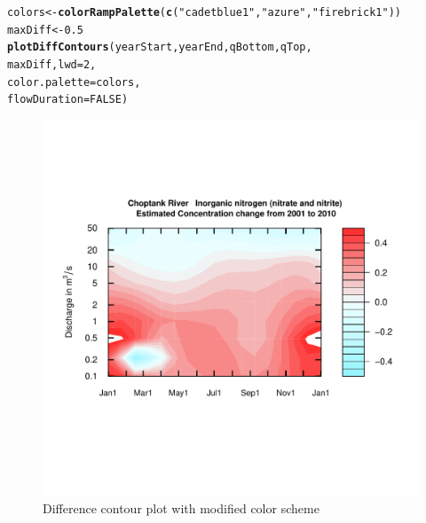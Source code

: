 \documentclass[a4paper,11pt]{article}\usepackage[]{graphicx}\usepackage[]{color}
\makeatletter
\newcommand{\hlnum}[1]{\textcolor[rgb]{0.686,0.059,0.569}{#1}}%
\newcommand{\hlstr}[1]{\textcolor[rgb]{0.192,0.494,0.8}{#1}}%
\newcommand{\hlstd}[1]{\textcolor[rgb]{0.345,0.345,0.345}{#1}}%
\newcommand{\hlkwb}[1]{\textcolor[rgb]{0.69,0.353,0.396}{#1}}%
\newcommand{\hlkwc}[1]{\textcolor[rgb]{0.333,0.667,0.333}{#1}}%
\newcommand{\hlkwd}[1]{\textcolor[rgb]{0.737,0.353,0.396}{\textbf{#1}}}%
\newenvironment{kframe}{%
 \def\at@end@of@kframe{}%
 \ifinner\ifhmode%
  \def\at@end@of@kframe{\end{minipage}}%
  \begin{minipage}{\columnwidth}%
 \fi\fi%
 \def\FrameCommand##1{\hskip\@totalleftmargin \hskip-\fboxsep
 \colorbox{shadecolor}{##1}\hskip-\fboxsep
     \hskip-\linewidth \hskip-\@totalleftmargin \hskip\columnwidth}%
 \MakeFramed {\advance\hsize-\width
   \@totalleftmargin\z@ \linewidth\hsize
   \@setminipage}}%
 {\par\unskip\endMakeFramed%
 \at@end@of@kframe}
\newenvironment{knitrout}{}{} %
\makeatother
\begin{document}
\begin{knitrout}
\color{fgcolor}\begin{kframe}
\begin{alltt}
\hlstd{colors} \hlkwb{<-} \hlkwd{colorRampPalette}\hlstd{(}\hlkwd{c}\hlstd{(}\hlstr{"cadetblue1"}\hlstd{,}\hlstr{"azure"}\hlstd{,}\hlstr{"firebrick1"}\hlstd{))}
\hlstd{maxDiff}\hlkwb{<-}\hlnum{0.5}
\hlkwd{plotDiffContours}\hlstd{(yearStart,yearEnd,qBottom,qTop,}
             \hlstd{maxDiff,}\hlkwc{lwd}\hlstd{=}\hlnum{2}\hlstd{,}
             \hlkwc{color.palette}\hlstd{=colors,}
             \hlkwc{flowDuration}\hlstd{=}\hlnum{FALSE}\hlstd{)}
\end{alltt}
\end{kframe}\begin{figure}[]

\includegraphics[width=1\linewidth,height=1\linewidth]{figure/modifiedDiffContour} \caption[Difference contour plot with modified color scheme]{Difference contour plot with modified color scheme\label{fig:modifiedDiffContour}}
\end{figure}


\end{knitrout}



\FloatBarrier
\end{document}
